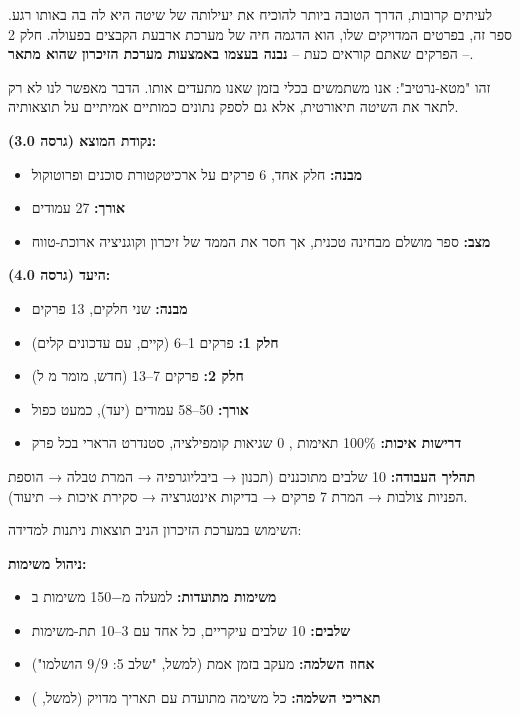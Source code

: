 

לעיתים קרובות, הדרך הטובה ביותר להוכיח את יעילותה של שיטה היא לה בה באותו רגע. ספר זה, בפרטים המדויקים שלו, הוא הדגמה חיה של מערכת ארבעת הקבצים בפעולה. חלק \num{2} – הפרקים שאתם קוראים כעת – \textbf{נבנה בעצמו באמצעות מערכת הזיכרון שהוא מתאר}.

זהו "מטא-נרטיב": אנו משתמשים בכלי בזמן שאנו מתעדים אותו. הדבר מאפשר לנו לא רק לתאר את השיטה תיאורטית, אלא גם לספק נתונים כמותיים אמיתיים על תוצאותיה.


\textbf{נקודת המוצא (גרסה \num{3.0}):}
\begin{itemize}
  \item \textbf{מבנה:} חלק אחד, \num{6} פרקים על ארכיטקטורת סוכנים ופרוטוקול 
  \item \textbf{אורך:} \num{27} עמודים
  \item \textbf{מצב:} ספר מושלם מבחינה טכנית, אך חסר את הממד של זיכרון וקוגניציה ארוכת-טווח
\end{itemize}

\textbf{היעד (גרסה \num{4.0}):}
\begin{itemize}
  \item \textbf{מבנה:} שני חלקים, \num{13} פרקים
  \item \textbf{חלק \num{1}:} פרקים \num{1}–\num{6} (קיים, עם עדכונים קלים)
  \item \textbf{חלק \num{2}:} פרקים \num{7}–\num{13} (חדש, מומר מ ל)
  \item \textbf{אורך:} \num{50}–\num{58} עמודים (יעד), כמעט כפול
  \item \textbf{דרישות איכות:} \num{100}\% תאימות , \num{0} שגיאות קומפילציה, סטנדרט הרארי בכל פרק
\end{itemize}

\textbf{תהליך העבודה:} \num{10} שלבים מתוכננים (תכנון → ביבליוגרפיה → המרת טבלה → הוספת הפניות צולבות → המרת \num{7} פרקים → בדיקות אינטגרציה → סקירת איכות → תיעוד).


השימוש במערכת הזיכרון הניב תוצאות ניתנות למדידה:

\textbf{ניהול משימות:}
\begin{itemize}
  \item \textbf{משימות מתועדות:} למעלה מ\num{-150} משימות ב
  \item \textbf{שלבים:} \num{10} שלבים עיקריים, כל אחד עם \num{3}–\num{10} תת-משימות
  \item \textbf{אחוז השלמה:} מעקב בזמן אמת (למשל, "שלב \num{5}: \num{9}/\num{9} הושלמו")
  \item \textbf{תאריכי השלמה:} כל משימה מתועדת עם תאריך מדויק (למשל, \checkmark{} )
\end{itemize}

